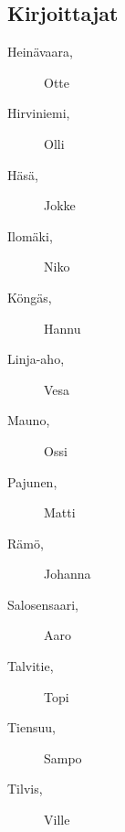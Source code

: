 \subsection*{Kirjoittajat}
\begin{description}
\item[Heinävaara, ] Otte
\item[Hirviniemi, ] Olli
\item[Häsä, ] Jokke
\item[Ilomäki, ] Niko
\item[Köngäs, ] Hannu
\item[Linja-aho, ] Vesa
\item[Mauno, ] Ossi
\item[Pajunen, ] Matti
\item[Rämö, ] Johanna
\item[Salosensaari, ] Aaro
\item[Talvitie, ] Topi
\item[Tiensuu, ] Sampo
\item[Tilvis, ] Ville
\end{description}
